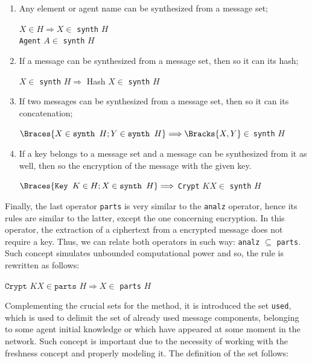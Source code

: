 \begin{enumerate}
  \item Any element or agent name can be synthesized from a message set;
  \begin{center}
    $X \in H \Longrightarrow X \in$ \texttt{synth} $H$ \\
    \texttt{Agent} $A \in$ \texttt{synth} $H$
  \end{center}

  \item If a message can be synthesized from a message set, then so it can its hash;
  \begin{center}
    $X \in$ \texttt{synth} $H \Longrightarrow$ Hash $X \in$ \texttt{synth} $H$
  \end{center}

  \item If two messages can be synthesized from a message set, then so it can its concatenation;
  \begin{center}
    $\Braces{X \in \texttt{synth } H; Y \in \texttt{synth } H} \Longrightarrow \Bracks{X,Y} \in$ \texttt{synth} $H$
  \end{center}

  \item If a key belongs to a message set and a message can be synthesized from it as well, then so the encryption of the message with the given key.
  \begin{center}
    $\Braces{\texttt{Key } K \in H; X \in \texttt{synth } H} \Longrightarrow$ \texttt{Crypt} $K X \in$ \texttt{synth} $H$
  \end{center}
\end{enumerate}

Finally, the last operator \texttt{parts} is very similar to the \texttt{analz} operator, hence its rules are similar to the latter, except the one concerning encryption. In this operator, the extraction of a ciphertext from a encrypted message does not require a key. Thus, we can relate both operators in such way: \texttt{analz} $\subseteq$ \texttt{parts}. Such concept simulates unbounded computational power and so, the rule is rewritten as follows:

\begin{center}
  $\texttt{Crypt } K X \in \texttt{parts } H \Longrightarrow X \in$ \texttt{parts} $H$
\end{center}

Complementing the crucial sets for the method, it is introduced the set \texttt{used}, which is used to delimit the set of already used message components, belonging to some agent initial knowledge or which have appeared at some moment in the network. Such concept is important due to the necessity of working with the freshness concept and properly modeling it. The definition of the set follows:

